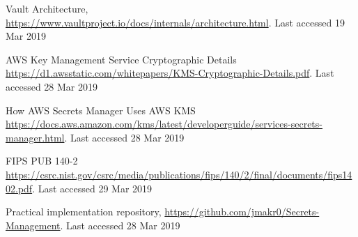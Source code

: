 \documentclass[runningheads]{llncs}
\begin{document}
\begin{thebibliography}{8}
Vault Architecture, \url{https://www.vaultproject.io/docs/internals/architecture.html}. Last accessed 19
Mar 2019

AWS Key Management Service Cryptographic Details
\url{https://d1.awsstatic.com/whitepapers/KMS-Cryptographic-Details.pdf}. Last accessed 28 Mar 2019

How AWS Secrets Manager Uses AWS KMS
\url{https://docs.aws.amazon.com/kms/latest/developerguide/services-secrets-manager.html}. Last accessed 28 Mar 2019

FIPS PUB 140-2
\url{https://csrc.nist.gov/csrc/media/publications/fips/140/2/final/documents/fips1402.pdf}. Last accessed 29 Mar 2019

Practical implementation repository, \url{https://github.com/jmakr0/Secrets-Management}. Last accessed 28
Mar 2019

\end{thebibliography}
\end{document}
